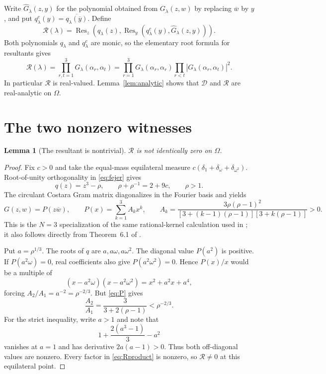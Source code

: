 \documentclass[11pt]{article}
\newtheorem{lemma}[theorem]{Lemma}
\newcommand{\Res}{\operatorname{Res}}
\begin{document}
Write $\widehat G_\lambda(z,y)$ for the polynomial obtained from
$G_\lambda(z,w)$ by replacing $\overline w$ by $y$, and put
$q_\lambda^c(y)=\overline{q_\lambda(\overline y)}$.  Define
\begin{equation}\label{eq:R}
 \mathcal R(\lambda)=
 \Res_z\!\left(q_\lambda(z),
   \Res_y\!\left(q_\lambda^c(y),\widehat G_\lambda(z,y)\right)
 \right).
\end{equation}
Both polynomials $q_\lambda$ and $q_\lambda^c$ are monic, so the elementary
root formula for resultants gives
\begin{equation}\label{eq:Rproduct}
 \mathcal R(\lambda)=
 \prod_{r,t=1}^3G_\lambda(\alpha_r,\alpha_t)
 =\prod_{r=1}^3G_\lambda(\alpha_r,\alpha_r)
  \prod_{r<t}|G_\lambda(\alpha_r,\alpha_t)|^2.
\end{equation}
In particular $\mathcal R$ is real-valued.  Lemma~\ref{lem:analytic} shows
that $\mathcal D$ and $\mathcal R$ are real-analytic on $\Omega$.

\section{The two nonzero witnesses}

\begin{lemma}[The resultant is nontrivial]\label{lem:Rnonzero}
$\mathcal R$ is not identically zero on $\Omega$.
\end{lemma}

\begin{proof}
Fix $c>0$ and take the equal-mass equilateral measure
$c(\delta_1+\delta_\omega+\delta_{\omega^2})$.  Root-of-unity
orthogonality in \eqref{eq:fejer} gives
\[
 q(z)=z^3-\rho,\qquad
 \rho+\rho^{-1}=2+9c,\qquad \rho>1.
\]
The circulant Costara Gram matrix diagonalizes in the Fourier basis and yields
\begin{equation}\label{eq:P}
 G(z,w)=P(z\overline w),\qquad
 P(x)=\sum_{k=1}^3A_kx^k,\qquad
 A_k=\frac{3\rho(\rho-1)^2}
 {[3+(k-1)(\rho-1)][3+k(\rho-1)]}>0.
\end{equation}
This is the $N=3$ specialization of the same rational-kernel calculation
used in \cite{JPS}; it also follows directly from Theorem~6.1 of \cite{CGR}.

Put $a=\rho^{1/3}$.  The roots of $q$ are $a,a\omega,a\omega^2$.
The diagonal value $P(a^2)$ is positive.  If $P(a^2\omega)=0$, real
coefficients also give $P(a^2\omega^2)=0$.  Hence $P(x)/x$ would be a
multiple of
\[
 (x-a^2\omega)(x-a^2\omega^2)=x^2+a^2x+a^4,
\]
forcing $A_2/A_1=a^{-2}=\rho^{-2/3}$.  But \eqref{eq:P} gives
\[
 \frac{A_2}{A_1}=\frac{3}{3+2(\rho-1)}<\rho^{-2/3}.
\]
For the strict inequality, write $a>1$ and note that
\[
 1+\frac{2(a^3-1)}3-a^2
\]
vanishes at $a=1$ and has derivative $2a(a-1)>0$.  Thus both off-diagonal
values are nonzero.  Every factor in \eqref{eq:Rproduct} is nonzero, so
$\mathcal R\ne0$ at this equilateral point.
\end{proof}
\end{document}
